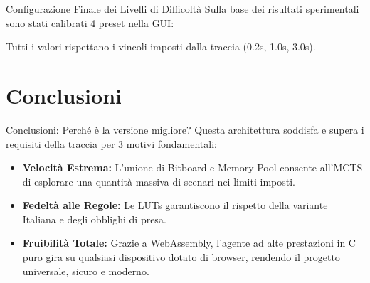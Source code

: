 \documentclass[10pt]{beamer}
\begin{document}
\begin{frame}{Configurazione Finale dei Livelli di Difficoltà}
    Sulla base dei risultati sperimentali sono stati calibrati 4 preset nella GUI:
    
    \vspace{0.2cm}
    \centering
    
    \vspace{0.4cm}
    \raggedright
    \small
    Tutti i valori rispettano i vincoli imposti dalla traccia (0.2s, 1.0s, 3.0s).
\end{frame}

\section{Conclusioni}
\begin{frame}{Conclusioni: Perché è la versione migliore?}
    Questa architettura soddisfa e supera i requisiti della traccia per 3 motivi fondamentali:
    \vspace{0.3cm}
    \begin{itemize}
        \item \textbf{Velocità Estrema:} L'unione di Bitboard e Memory Pool consente all'MCTS di esplorare una quantità massiva di scenari nei limiti imposti.
        \item \textbf{Fedeltà alle Regole:} Le LUTs garantiscono il rispetto della variante Italiana e degli obblighi di presa.
        \item \textbf{Fruibilità Totale:} Grazie a WebAssembly, l'agente ad alte prestazioni in C puro gira su qualsiasi dispositivo dotato di browser, rendendo il progetto universale, sicuro e moderno.
    \end{itemize}
\end{frame}
\end{document}
